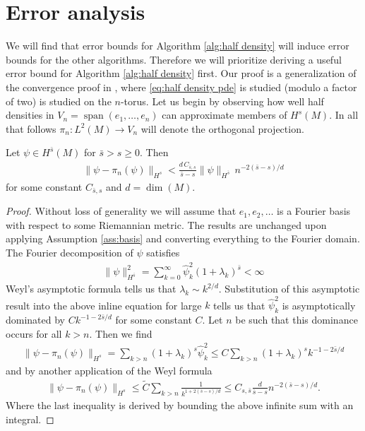\documentclass[final,leqno]{siamltex1213}
\begin{document}
\section{Error analysis}
We will find that error bounds for Algorithm \ref{alg:half density} will induce error bounds for the other algorithms.
Therefore we will prioritize deriving a useful error bound for Algorithm \ref{alg:half density} first.
Our proof is a generalization of the convergence proof in \cite{Pasciak1980}, where \eqref{eq:half density pde} is studied (modulo a factor of two) is studied on the $n$-torus.
Let us begin by observing how well half densities in $V_{n} = \operatorname{span}( e_{1},\dots,e_{n})$ can approximate members of $H^{s}(M)$.
In all that follows $\pi_{n}: L^{2}(M) \to V_{n}$ will denote the orthogonal projection.

\begin{proposition} \label{prop:approximation}
	Let $\psi \in H^{\bar{s}}(M)$ for $\bar{s} > s \geq 0$.
	Then
	\begin{align}
		\| \psi - \pi_{n}(\psi) \|_{H^{s}} <  \frac{d \, C_{\bar{s},s} }{ \bar{s}-s} \| \psi \|_{H^{\bar{s}}} \, n^{-2(\bar{s}-s)/d}
	\end{align}
	for some constant $C_{\bar{s},s}$ and $d = \dim(M)$.
\end{proposition}
\begin{proof}
	Without loss of generality we will assume that $e_{1},e_{2},\dots$ is a Fourier basis with respect to some Riemannian metric.
	The results are unchanged upon applying Assumption \ref{ass:basis} and converting everything to the Fourier domain.
	The Fourier decomposition of $\psi$ satisfies
	\begin{align}
		\| \psi \|^{2}_{H^{\bar{s} }} = \sum_{k=0}^{\infty} \hat{\psi}_{k}^{2} (1+\lambda_{k})^{\bar{s}} < \infty
	\end{align}
	Weyl's asymptotic formula tells us that $\lambda_{k} \sim k^{2/d}$.
	Substitution of this asymptotic result into the above inline equation for large $k$ tells us that $\hat{\psi}_{k}^{2}$ is asymptotically dominated by  $C k^{-1- 2\bar{s}/d}$
	for some constant $C$.
	Let $n$ be such that this dominance occurs for all $k>n$.  Then we find
	\begin{align}
		\| \psi - \pi_{n}(\psi) \|_{H^{s}} = \sum_{k>n} (1+\lambda_{k})^{s} \hat{\psi}_{k}^{2} \leq C \sum_{k>n} (1+\lambda_{k})^{s} k^{-1- 2\bar{s}/d}
	\end{align}
	and by another application of the Weyl formula
	\begin{align}
		\| \psi - \pi_{n}(\psi) \|_{H^{s}} \leq \tilde{C} \sum_{k>n} \frac{1}{k^{1+2(\bar{s}-s)/d}} \leq C_{s,\bar{s}}  \frac{d }{ \bar{s}-s} n^{-2(\bar{s}-s)/d}.
	\end{align}
	Where the last inequality is derived by bounding the above infinite sum with an integral.
\end{proof}
\end{document}
